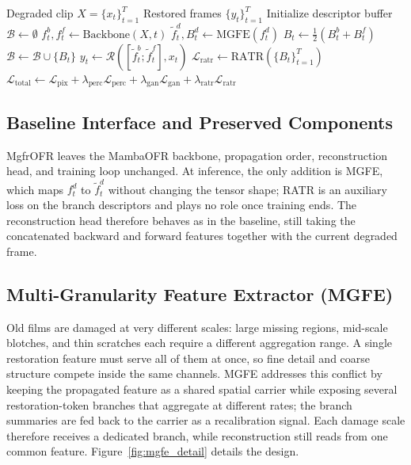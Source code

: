 \documentclass[symmetry,article,submit,pdftex,moreauthors]{Definitions/mdpi}
\begin{document}
\begin{algorithm}[H]
\caption{MgfrOFR forward pass for a clip of length $T$.\label{alg:mgfrofr}}
\begin{algorithmic}[1]
\Require Degraded clip $X=\{x_t\}_{t=1}^{T}$
\Ensure Restored frames $\{y_t\}_{t=1}^{T}$
\State Initialize descriptor buffer $\mathcal{B} \leftarrow \emptyset$
    \State $f_t^{b}, f_t^{f} \leftarrow \text{Backbone}(X, t)$ 
        \State $\widetilde{f}_t^{d}, B_t^{d} \leftarrow \text{MGFE}(f_t^{d})$ 
    \EndFor
    \State $B_t \leftarrow \frac{1}{2}(B_t^{b} + B_t^{f})$ 
    \State $\mathcal{B} \leftarrow \mathcal{B} \cup \{B_t\}$ 
    \State $y_t \leftarrow \mathcal{R}([\widetilde{f}_t^{b}; \widetilde{f}_t^{f}], x_t)$ 
\EndFor
{}
    \State $\mathcal{L}_{\text{ratr}} \leftarrow \text{RATR}(\{B_t\}_{t=1}^{T})$ 
    \State $\mathcal{L}_{\text{total}} \leftarrow \mathcal{L}_{\text{pix}} + \lambda_{\text{perc}}\mathcal{L}_{\text{perc}} + \lambda_{\text{gan}}\mathcal{L}_{\text{gan}} + \lambda_{\text{ratr}}\mathcal{L}_{\text{ratr}}$
\EndIf
\end{algorithmic}
\end{algorithm}

\subsection{Baseline Interface and Preserved Components}
\label{subsec:baseline_interface}

MgfrOFR leaves the MambaOFR backbone, propagation order, reconstruction head, and training loop unchanged. At inference, the only addition is MGFE, which maps $f_t^{d}$ to $\widetilde{f}_t^{d}$ without changing the tensor shape; RATR is an auxiliary loss on the branch descriptors and plays no role once training ends. The reconstruction head therefore behaves as in the baseline, still taking the concatenated backward and forward features together with the current degraded frame.

\subsection{Multi-Granularity Feature Extractor (MGFE)}
\label{subsec:mgfe}

Old films are damaged at very different scales: large missing regions, mid-scale blotches, and thin scratches each require a different aggregation range. A single restoration feature must serve all of them at once, so fine detail and coarse structure compete inside the same channels. MGFE addresses this conflict by keeping the propagated feature as a shared spatial carrier while exposing several restoration-token branches that aggregate at different rates; the branch summaries are fed back to the carrier as a recalibration signal. Each damage scale therefore receives a dedicated branch, while reconstruction still reads from one common feature. Figure~\ref{fig:mgfe_detail} details the design.
\end{document}
